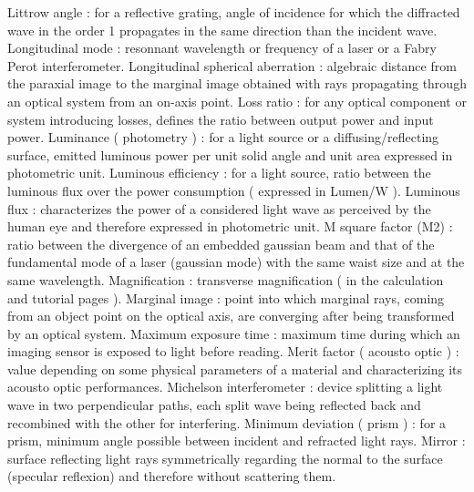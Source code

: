 Littrow angle                                        : for a reflective grating, angle of incidence for which the diffracted wave in the order 1 propagates in the same direction than the incident wave.
Longitudinal mode                                    : resonnant wavelength or frequency of a laser or a Fabry Perot interferometer.
Longitudinal spherical aberration                    : algebraic distance from the paraxial image to the marginal image obtained with rays propagating through an optical system from an on-axis point.
Loss ratio                                           : for any optical component or system introducing losses, defines the ratio between output power and input power.
Luminance ( photometry )                             : for a light source or a diffusing/reflecting surface, emitted luminous power per unit solid angle and unit area expressed in photometric unit.
Luminous efficiency                                  : for a light source, ratio between the luminous flux over the power consumption ( expressed in Lumen/W ).
Luminous flux                                        : characterizes the power of a considered light wave as perceived by the human eye and therefore expressed in photometric unit.
M square factor (M2)                                 : ratio between the divergence of an embedded gaussian beam and that of the fundamental mode of a laser (gaussian mode) with the same waist size and at the same wavelength.
Magnification                                        : transverse magnification ( in the calculation and tutorial pages ).
Marginal image                                       : point into which marginal rays, coming from an object point on the optical axis, are converging after being transformed by an optical system.
Maximum exposure time                                : maximum time during which an imaging sensor is exposed to light before reading.
Merit factor ( acousto optic )                       : value depending on some physical parameters of a material and characterizing its acousto optic performances.
Michelson interferometer                             : device splitting a light wave in two perpendicular paths, each split wave being reflected back and recombined with the other for interfering.
Minimum deviation ( prism )                          : for a prism, minimum angle possible between incident and refracted light rays.
Mirror                                               : surface reflecting light rays symmetrically regarding the normal to the surface (specular reflexion) and therefore without scattering them.
